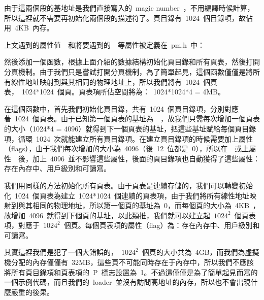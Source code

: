 由于這兩個段的基地址是我們直接寫入的~magic number~，不用編譯時候計算，所以這裡就不需要再初始化兩個段的描述符了。頁目錄有~1024~個目錄項，故佔用~4KB~內存。

上文遇到的屬性值~~和將要遇到的~~等屬性被定義在~pm.h~中：


然後添加一個函數，根據上面介紹的數據結構初始化頁目錄和所有頁表，然後打開分頁機制。由于我們只是嘗試打開分頁機制，為了簡單起見，這個函數僅僅是將所有線性地址映射到與其相同的物理地址上，所以我們將有~1024~個頁表，~1024*1024~個頁。頁表項所佔空間將為：~1024*1024*4 = 4MB。


在這個函數中，首先我們初始化頁目錄，共有~1024~個頁目錄項，分別對應著~1024~個頁表。由于已知第一個頁表的基址為~~，故我們只需每次增加一個頁表的大小（1024*4 = 4096）就得到下一個頁表的基址，把這些基址賦給每個頁目錄項，循環~1024~次就能建立所有頁目錄項。在建立頁目錄項的時候需要加上屬性（flags），由于我們每次增加的大小為~4096（後~12~位都是~0），所以在~~或上屬性~~後，加上~4096~並不影響這些屬性，後面的頁目錄項也自動獲得了這些屬性：存在內存中、用戶級別和可讀寫。

我們用同樣的方法初始化所有頁表。由于頁表是連續存儲的，我們可以轉變初始化~1024~個頁表為建立~1024*1024~個連續的頁表項，由于我們將所有線性地址映射到與其相同的物理地址，所以第一個頁的基址為~0，而每個頁的大小為~4KB~，故增加~4096~就得到下個頁的基址，以此類推，我們就可以建立起~$1024^2$~個頁表項，對應于~$1024^2$~個頁。每個頁表項的屬性（flag）為：存在內存中、用戶級別和可讀寫。

其實這裡我們是犯了一個大錯誤的，~$1024^2$~個頁的大小共為~4GB，而我們為虛擬機分配的內存僅僅有~32MB，這些頁不可能同時存在于內存中，所以我們不應該將所有頁目錄項和頁表項的~P~標志設置為~1。不過這僅僅是為了簡單起見而寫的一個示例代碼，而且我們的~loader~並沒有訪問高地址的內存，所以也不會出現什麼嚴重的後果。

